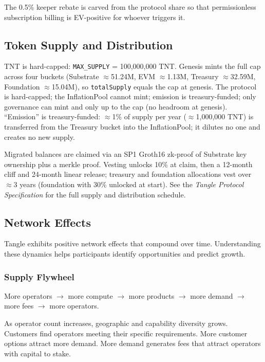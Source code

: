 \documentclass[11pt,a4paper]{article}
\begin{document}
The 0.5\% keeper rebate is carved from the protocol share so that permissionless subscription billing is EV-positive for whoever triggers it.

\subsection{Token Supply and Distribution}

TNT is hard-capped: \texttt{MAX\_SUPPLY} = 100,000,000 TNT.
Genesis mints the full cap across four buckets (Substrate $\approx$51.24M, EVM $\approx$1.13M, Treasury $\approx$32.59M, Foundation $\approx$15.04M), so \texttt{totalSupply} equals the cap at genesis.
The protocol is hard-capped; the InflationPool cannot mint; emission is treasury-funded; only governance can mint and only up to the cap (no headroom at genesis). ``Emission'' is treasury-funded: $\approx$1\% of supply per year ($\approx$1,000,000 TNT)
is transferred from the Treasury bucket into the InflationPool; it dilutes no one and creates no new supply.

Migrated balances are claimed via an SP1 Groth16 zk-proof of Substrate key ownership plus a merkle proof. Vesting unlocks 10\% at claim, then a 12-month cliff and 24-month linear release; treasury and foundation allocations vest over $\approx$3 years (foundation with 30\% unlocked at start). See the \textit{Tangle Protocol Specification} for the full supply and distribution schedule.

\subsection{Network Effects}

Tangle exhibits positive network effects that compound over time. Understanding these dynamics helps participants identify opportunities and predict growth.

\subsubsection{Supply Flywheel}

More operators $\rightarrow$ more compute $\rightarrow$ more products $\rightarrow$ more demand $\rightarrow$ more fees $\rightarrow$ more operators.

As operator count increases, geographic and capability diversity grows. Customers find operators meeting their specific requirements. More customer options attract more demand. More demand generates fees that attract operators with capital to stake.
\end{document}
